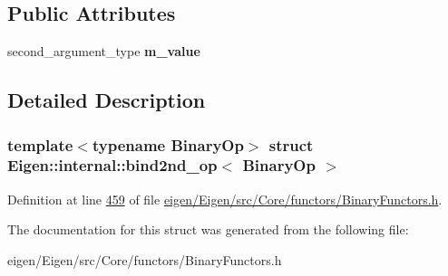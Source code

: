 \subsection*{Public Attributes}
\begin{DoxyCompactItemize}
\item 
\mbox{\label{struct_eigen_1_1internal_1_1bind2nd__op_a816ed96eec76ba3ccb8d3e71f62776ee}} 
second\+\_\+argument\+\_\+type {\bfseries m\+\_\+value}
\end{DoxyCompactItemize}


\subsection{Detailed Description}
\subsubsection*{template$<$typename Binary\+Op$>$\newline
struct Eigen\+::internal\+::bind2nd\+\_\+op$<$ Binary\+Op $>$}



Definition at line \hyperlink{eigen_2_eigen_2src_2_core_2functors_2_binary_functors_8h_source_l00459}{459} of file \hyperlink{eigen_2_eigen_2src_2_core_2functors_2_binary_functors_8h_source}{eigen/\+Eigen/src/\+Core/functors/\+Binary\+Functors.\+h}.



The documentation for this struct was generated from the following file\+:\begin{DoxyCompactItemize}
\item 
eigen/\+Eigen/src/\+Core/functors/\+Binary\+Functors.\+h\end{DoxyCompactItemize}
